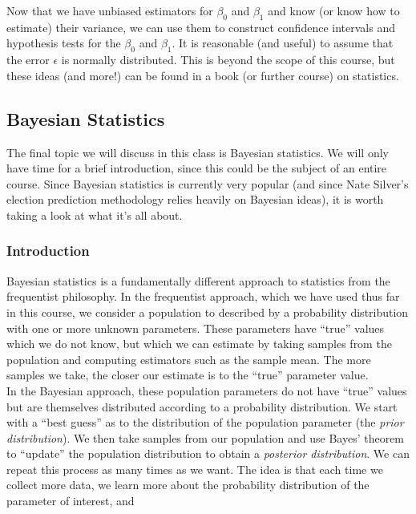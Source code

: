 \documentclass[notes.tex]{subfiles}
\begin{document}
Now that we have unbiased estimators for $\beta_0$ and $\beta_1$ and know (or know how to estimate) their variance, we can use them to construct confidence intervals and hypothesis tests for the $\beta_0$ and $\beta_1$. It is reasonable (and useful) to assume that the error $\epsilon$ is normally distributed. This is beyond the scope of this course, but these ideas (and more!) can be found in a book (or further course) on statistics.

\subsection{Bayesian Statistics}
The final topic we will discuss in this class is Bayesian statistics. We will only have time for a brief introduction, since this could be the subject of an entire course. Since Bayesian statistics is currently very popular (and since Nate Silver's election prediction methodology relies heavily on Bayesian ideas), it is worth taking a look at what it's all about.

\subsubsection{Introduction}
Bayesian statistics is a fundamentally different approach to statistics from the frequentist philosophy. In the frequentist approach, which we have used thus far in this course, we consider a population to described by a probability distribution with one or more unknown parameters. These parameters have ``true'' values which we do not know, but which we can estimate by taking samples from the population and computing estimators such as the sample mean. The more samples we take, the closer our estimate is to the ``true'' parameter value.\\

In the Bayesian approach, these population parameters do not have ``true'' values but are themselves distributed according to a probability distribution. We start with a ``best guess'' as to the distribution of the population parameter (the \emph{prior distribution}). We then take samples from our population and use Bayes' theorem to ``update'' the population distribution to obtain a \emph{posterior distribution}. We can repeat this process as many times as we want. The idea is that each time we collect more data, we learn more about the probability distribution of the parameter of interest, and \\
\end{document}
